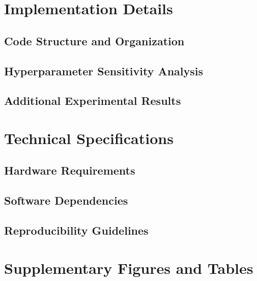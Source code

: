 \documentclass[
	english,
	ruledheaders=section,
	class=report,
	thesis={type=master},
	accentcolor=9c,
	custommargins=true,
	marginpar=false,
	parskip=half-,
	fontsize=11pt,
]{tudapub}
\begin{document}
\printbibliography[title={References}]

\appendix

\chapter{Implementation Details}
\label{app:implementation}

\section{Code Structure and Organization}
\label{app:code_structure}

\section{Hyperparameter Sensitivity Analysis}
\label{app:hyperparameter_analysis}

\section{Additional Experimental Results}
\label{app:additional_results}

\chapter{Technical Specifications}
\label{app:technical_specs}

\section{Hardware Requirements}
\label{app:hardware_requirements}

\section{Software Dependencies}
\label{app:software_dependencies}

\section{Reproducibility Guidelines}
\label{app:reproducibility}

\chapter{Supplementary Figures and Tables}
\label{app:supplementary}
\end{document}
